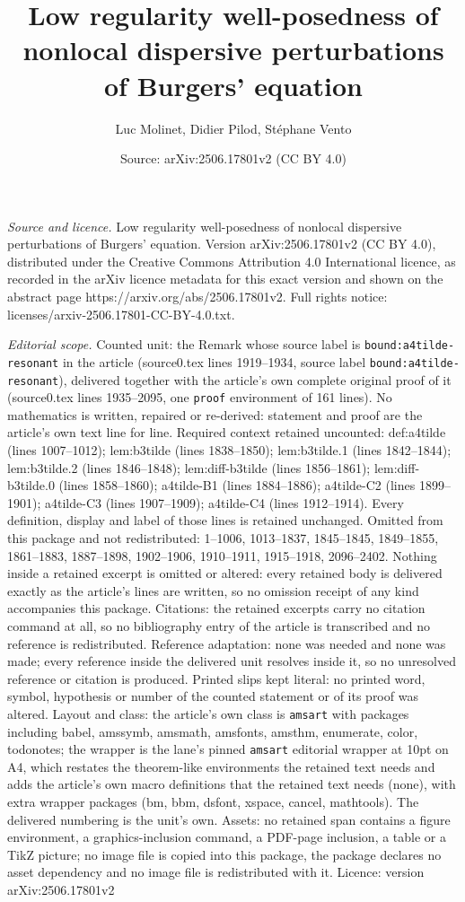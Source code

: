 \documentclass[10pt,a4paper]{amsart}
\title[Low regularity well-posedness of nonlocal dispersive perturb]{Low regularity well-posedness of nonlocal dispersive perturbations of Burgers' equation}
\author{Luc Molinet, Didier Pilod, St\'ephane Vento}
\date{Source: arXiv:2506.17801v2 (CC BY 4.0)}
\begin{document}
\maketitle

\noindent\emph{Source and licence.} Low regularity well-posedness of nonlocal dispersive perturbations of Burgers' equation. Version arXiv:2506.17801v2 (CC BY 4.0), distributed under the Creative Commons Attribution 4.0 International licence, as recorded in the arXiv licence metadata for this exact version and shown on the abstract page https://arxiv.org/abs/2506.17801v2. Full rights notice: licenses/arxiv-2506.17801-CC-BY-4.0.txt.\par\smallskip

\noindent\textit{Editorial scope.} Counted unit: the Remark whose source label is \texttt{bound:a4tilde-resonant} in the article (source0.tex lines 1919--1934, source label \texttt{bound:a4tilde-resonant}), delivered together with the article's own complete original proof of it (source0.tex lines 1935--2095, one \texttt{proof} environment of 161 lines). No mathematics is written, repaired or re-derived: statement and proof are the article's own text line for line. Required context retained uncounted: def:a4tilde (lines 1007--1012); lem:b3tilde (lines 1838--1850); lem:b3tilde.1 (lines 1842--1844); lem:b3tilde.2 (lines 1846--1848); lem:diff-b3tilde (lines 1856--1861); lem:diff-b3tilde.0 (lines 1858--1860); a4tilde-B1 (lines 1884--1886); a4tilde-C2 (lines 1899--1901); a4tilde-C3 (lines 1907--1909); a4tilde-C4 (lines 1912--1914). Every definition, display and label of those lines is retained unchanged. Omitted from this package and not redistributed: 1--1006, 1013--1837, 1845--1845, 1849--1855, 1861--1883, 1887--1898, 1902--1906, 1910--1911, 1915--1918, 2096--2402. Nothing inside a retained excerpt is omitted or altered: every retained body is delivered exactly as the article's lines are written, so no omission receipt of any kind accompanies this package. Citations: the retained excerpts carry no citation command at all, so no bibliography entry of the article is transcribed and no reference is redistributed. Reference adaptation: none was needed and none was made; every reference inside the delivered unit resolves inside it, so no unresolved reference or citation is produced. Printed slips kept literal: no printed word, symbol, hypothesis or number of the counted statement or of its proof was altered. Layout and class: the article's own class is \texttt{amsart} with packages including babel, amssymb, amsmath, amsfonts, amsthm, enumerate, color, todonotes; the wrapper is the lane's pinned \texttt{amsart} editorial wrapper at 10pt on A4, which restates the theorem-like environments the retained text needs and adds the article's own macro definitions that the retained text needs (none), with extra wrapper packages (bm, bbm, dsfont, xspace, cancel, mathtools). The delivered numbering is the unit's own. Assets: no retained span contains a figure environment, a graphics-inclusion command, a PDF-page inclusion, a table or a TikZ picture; no image file is copied into this package, the package declares no asset dependency and no image file is redistributed with it. Licence: version arXiv:2506.17801v2 
\end{document}
